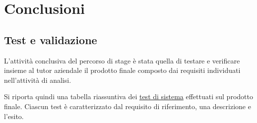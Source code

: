 \chapter{Conclusioni}
\label{cap:conclusioni}


\setlength{\parskip}{3ex}

\section{Test e validazione}
L'attività conclusiva del percorso di stage è stata quella di testare e verificare insieme al tutor aziendale il prodotto finale composto dai requisiti individuati nell'attività di analisi.

\setlength{\parskip}{3ex} 

\noindent Si riporta quindi una tabella riassuntiva dei {\hyperref[para:test-definition]{test di sistema}}\glsfirstoccur \; effettuati sul prodotto finale. Ciascun test è caratterizzato dal requisito di riferimento, una descrizione e l'esito.

\pagebreak

